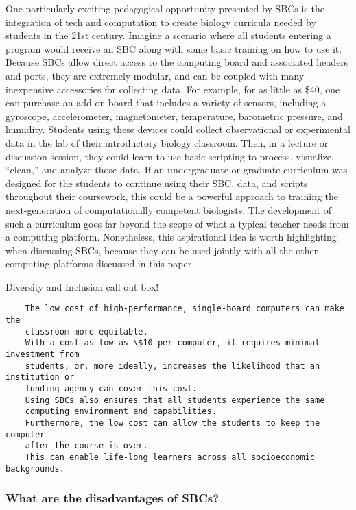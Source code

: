 One particularly exciting pedagogical opportunity presented by SBCs is
the integration of tech and computation to create biology curricula needed by
students in the 21st century.
Imagine a scenario where all students entering a program would receive an SBC
along with some basic training on how to use it.
Because SBCs allow direct access to the computing board and
associated headers and ports, they are extremely modular, and can be coupled
with many inexpensive accessories for collecting data.
For example, for as little as \$40, one can purchase an add-on board that
includes a variety of sensors, including a gyroscope, accelerometer,
magnetometer, temperature, barometric pressure, and humidity.
Students using these devices could collect observational or
experimental data in the lab of their introductory biology classroom.
Then, in a lecture or discussion session, they could learn to use basic
scripting to process, visualize, ``clean,'' and analyze those data.
If an undergraduate or graduate curriculum was designed for the students to
continue using their SBC, data, and scripts throughout their coursework, this
could be a powerful approach to training the next-generation of computationally
competent biologists.
The development of such a curriculum goes far beyond the scope of what a
typical teacher needs from a computing platform.
Nonetheless, this aspirational idea is worth highlighting when discussing
SBCs, because they can be used jointly with all the other computing platforms
discussed in this paper.


{\begin{framed}
Diversity and Inclusion call out box! 
\begin{snugshade*}
\begin{lstlisting}
    The low cost of high-performance, single-board computers can make the
    classroom more equitable.
    With a cost as low as \$10 per computer, it requires minimal investment from
    students, or, more ideally, increases the likelihood that an institution or
    funding agency can cover this cost.
    Using SBCs also ensures that all students experience the same
    computing environment and capabilities.
    Furthermore, the low cost can allow the students to keep the computer
    after the course is over.
    This can enable life-long learners across all socioeconomic backgrounds.
\end{lstlisting}
\end{snugshade*}
\end{framed}}

\subsubsection{What are the disadvantages of SBCs?}

